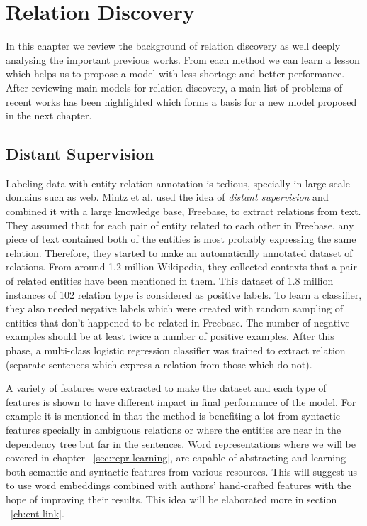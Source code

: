 \chapter{Relation Discovery}
\label{ch:rel-discovery}
In this chapter we review the background of relation discovery as well
deeply analysing the important previous works. From each method we can learn a
lesson which helps us to propose a model with less shortage and better
performance. After reviewing main models for relation discovery, a main list of
problems of recent works has been highlighted which forms a basis for a new
model proposed in the next chapter.
\section{Distant Supervision}
\label{sec:dist-supervision}


Labeling data with entity-relation annotation is tedious, specially in large
scale domains such as web. Mintz et al. \cite{Mintz2009} used the idea of
\emph{distant supervision} and combined it with a large knowledge base,
Freebase, to extract relations from text. They assumed that for each pair of
entity related to each other in Freebase, any piece of text contained both of
the entities is most probably expressing the same relation. Therefore, they
started to make an automatically annotated dataset of relations. From around 1.2
million Wikipedia, they collected contexts that a pair of related entities have
been mentioned in them. This dataset of 1.8 million instances of 102 relation
type is considered as positive labels. To learn a classifier, they also needed
negative labels which were created with random sampling of entities that don't
happened to be related in Freebase. The number of negative examples should be at
least twice a number of positive examples. After this phase, a multi-class
logistic regression classifier was trained to extract relation (separate
sentences which express a relation from those which do not).

A variety of features were extracted to make the dataset and each type of
features is shown to have different impact in final performance of the model.
For example it is mentioned in \cite{Mintz2009} that the method is benefiting a lot
from syntactic features specially in ambiguous relations or where the entities
are near in the dependency tree but far in the sentences. Word representations
where we will be covered in chapter ~\ref{sec:repr-learning}, are capable of
abstracting and learning both semantic and syntactic features from various
resources. This will suggest us to use word embeddings combined with
authors' hand-crafted features with the hope of improving their results. This
idea will be elaborated more in section ~\ref{ch:ent-link}.

